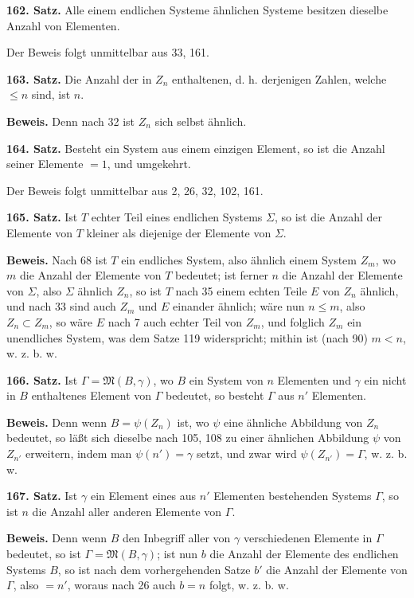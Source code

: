 \documentclass[11pt]{article}
\newcommand{\Mf}{\mathfrak{M}}
\newcommand{\partof}{\mathrel{\subset}}
\begin{document}
\noindent\textbf{162. Satz.} Alle einem endlichen Systeme ähnlichen Systeme besitzen dieselbe Anzahl von Elementen.

Der Beweis folgt unmittelbar aus 33, 161.

\noindent\textbf{163. Satz.} Die Anzahl der in $Z_n$ enthaltenen, d. h. derjenigen Zahlen, welche $\leq n$ sind, ist $n$.

\noindent\textbf{Beweis.} Denn nach 32 ist $Z_n$ sich selbst ähnlich.

\noindent\textbf{164. Satz.} Besteht ein System aus einem einzigen Element, so ist die Anzahl seiner Elemente $=1$, und umgekehrt.

Der Beweis folgt unmittelbar aus 2, 26, 32, 102, 161.

\noindent\textbf{165. Satz.} Ist $T$ echter Teil eines endlichen Systems $\Sigma$, so ist die Anzahl der Elemente von $T$ kleiner als diejenige der Elemente von $\Sigma$.

\noindent\textbf{Beweis.} Nach 68 ist $T$ ein endliches System, also ähnlich einem System $Z_m$, wo $m$ die Anzahl der Elemente von $T$ bedeutet; ist ferner $n$ die Anzahl der Elemente von $\Sigma$, also $\Sigma$ ähnlich $Z_n$, so ist $T$ nach 35 einem echten Teile $E$ von $Z_n$ ähnlich, und nach 33 sind auch $Z_m$ und $E$ einander ähnlich; wäre nun $n\leq m$, also $Z_n\partof Z_m$, so wäre $E$ nach 7 auch echter Teil von $Z_m$, und folglich $Z_m$ ein unendliches System, was dem Satze 119 widerspricht; mithin ist (nach 90) $m<n$, w. z. b. w.

\noindent\textbf{166. Satz.} Ist $\Gamma=\Mf(B,\gamma)$, wo $B$ ein System von $n$ Elementen und $\gamma$ ein nicht in $B$ enthaltenes Element von $\Gamma$ bedeutet, so besteht $\Gamma$ aus $n'$ Elementen.

\noindent\textbf{Beweis.} Denn wenn $B=\psi(Z_n)$ ist, wo $\psi$ eine ähnliche Abbildung von $Z_n$ bedeutet, so läßt sich dieselbe nach 105, 108 zu einer ähnlichen Abbildung $\psi$ von $Z_{n'}$ erweitern, indem man $\psi(n')=\gamma$ setzt, und zwar wird $\psi(Z_{n'})=\Gamma$, w. z. b. w.

\noindent\textbf{167. Satz.} Ist $\gamma$ ein Element eines aus $n'$ Elementen bestehenden Systems $\Gamma$, so ist $n$ die Anzahl aller anderen Elemente von $\Gamma$.

\noindent\textbf{Beweis.} Denn wenn $B$ den Inbegriff aller von $\gamma$ verschiedenen Elemente in $\Gamma$ bedeutet, so ist $\Gamma=\Mf(B,\gamma)$; ist nun $b$ die Anzahl der Elemente des endlichen Systems $B$, so ist nach dem vorhergehenden Satze $b'$ die Anzahl der Elemente von $\Gamma$, also $=n'$, woraus nach 26 auch $b=n$ folgt, w. z. b. w.
\end{document}
